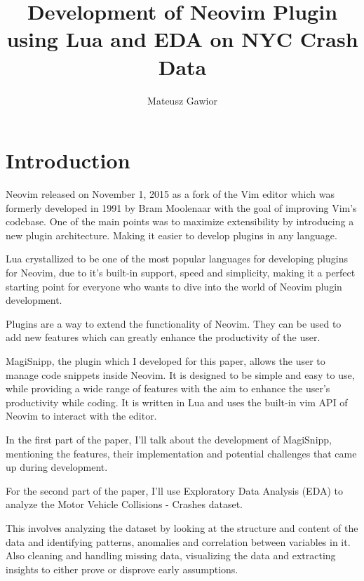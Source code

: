 \documentclass[runningheads]{llncs}
\begin{document}

\title{Development of Neovim Plugin using Lua and EDA on NYC Crash Data}

\author{Mateusz Gawior}


\maketitle

\section{Introduction}

Neovim released on November 1, 2015 as a fork of the Vim editor which was
formerly developed in 1991 by Bram Moolenaar with the goal of improving Vim's codebase. 
One of the main points was to maximize extensibility by introducing a new plugin architecture.
Making it easier to develop plugins in any language.

Lua crystallized to be one of the most popular languages for developing plugins for Neovim,
due to it's built-in support, speed and simplicity, making it a perfect starting point for
everyone who wants to dive into the world of Neovim plugin development.

Plugins are a way to extend the functionality of Neovim.
They can be used to add new features which can greatly enhance
the productivity of the user.

MagiSnipp, the plugin which I developed for this paper,
allows the user to manage code snippets inside Neovim.
It is designed to be simple and easy to use, while providing a wide range of features with the aim to enhance the user's productivity while coding.
It is written in Lua and uses the built-in vim API \cite{API} of Neovim to interact with the editor.

In the first part of the paper, I'll talk about the development of MagiSnipp,
mentioning the features, their implementation and potential challenges that came up during development.

For the second part of the paper, I'll use Exploratory Data Analysis (EDA)
to analyze the Motor Vehicle Collisions - Crashes \cite{DATA} dataset.

This involves analyzing the dataset by looking at the structure and content of the data and identifying patterns, anomalies 
and correlation between variables in it. Also cleaning and handling missing data, visualizing the data and
extracting insights to either prove or disprove early assumptions.
\end{document}
